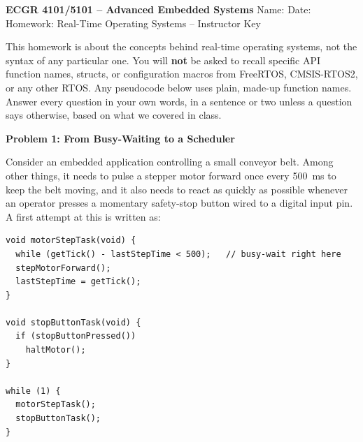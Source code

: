 \documentclass[11pt]{article}
\newcommand{\docsuffix}{ -- Instructor Key}
\newcommand{\docsuffix}{}
\begin{document}
{\Large\bfseries ECGR 4101/5101 -- Advanced Embedded Systems}\hfill
Name: \underline{\hspace{5cm}}\quad Date: \underline{\hspace{2.5cm}}\\[2pt]
{\large Homework: Real-Time Operating Systems\docsuffix}

\smallskip
This homework is about the concepts behind real-time operating systems, not
the syntax of any particular one. You will \textbf{not} be asked to recall
specific API function names, structs, or configuration macros from FreeRTOS,
CMSIS-RTOS2, or any other RTOS. Any pseudocode below uses plain, made-up
function names. Answer every question in your own words, in a sentence or
two unless a question says otherwise, based on what we covered in class.

\bigskip
\textbf{Problem 1: From Busy-Waiting to a Scheduler}

\smallskip
Consider an embedded application controlling a small conveyor belt. Among
other things, it needs to pulse a stepper motor forward once every
500~ms to keep the belt moving, and it also needs to react as quickly as
possible whenever an operator presses a momentary safety-stop button wired
to a digital input pin. A first attempt at this is written as:

\begin{verbatim}
void motorStepTask(void) {
  while (getTick() - lastStepTime < 500);   // busy-wait right here
  stepMotorForward();
  lastStepTime = getTick();
}

void stopButtonTask(void) {
  if (stopButtonPressed())
    haltMotor();
}

while (1) {
  motorStepTask();
  stopButtonTask();
}
\end{verbatim}
\end{document}
